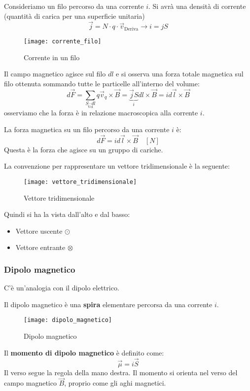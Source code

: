 \documentclass[a4paper]{article}
\begin{document}
\begin{example}
  Consideriamo un filo percorso da una corrente \( i \). Si avrà una densità di
  corrente (quantità di carica per una superficie unitaria)
  \[
    \vec{j} = N \cdot q \cdot \vec{v}_{\text{Deriva}} \to i = jS
  \] 
  \begin{figure}[H]
    \centering
    \texttt{[image: corrente\_filo]}
    \caption{Corrente in un filo}
  \end{figure}
  \noindent
  Il campo magnetico agisce sul filo \( dl \) e si osserva una forza totale magnetica sul filo
  ottenuta sommando tutte le particelle all'interno del volume:
  \[
    d\vec{F} = \sum_{\underset{\text{Vol}}{S \cdot dl}} q \vec{v}_q \times \vec{B}
    = \underbrace{\vec{j} S}_{i} dl \times \vec{B} = i d\vec{l} \times \vec{B}
  \] 
  osserviamo che la forza è in relazione macroscopica alla corrente \( i \).
\end{example}

\begin{definition}
  La forza magnetica su un filo percorso da una corrente \( i \) è:
  \[
    d\vec{F} = i d\vec{l} \times \vec{B} \quad \left[ N \right]
  \] 
  Questa è la forza che agisce su un gruppo di cariche.
\end{definition}

\begin{define}
  La convenzione per rappresentare un vettore tridimensionale è la seguente:
  \begin{figure}[H]
    \centering
    \texttt{[image: vettore\_tridimensionale]}
    \caption{Vettore tridimensionale}
  \end{figure}
  \noindent
  Quindi si ha la vista dall'alto e dal basso:
  \begin{itemize}
    \item Vettore uscente \( \odot \)
    \item Vettore entrante \( \otimes \)
  \end{itemize}
\end{define}

\subsubsection{Dipolo magnetico}
C'è un'analogia con il dipolo elettrico.
\begin{definition}
  Il dipolo magnetico è una \textbf{spira} elementare percorsa da una corrente \( i \).
  \begin{figure}[H]
    \centering
    \texttt{[image: dipolo\_magnetico]}
    \caption{Dipolo magnetico}
  \end{figure}
  \noindent
  Il \textbf{momento di dipolo magnetico} è definito come:
  \[
    \vec{\mu} = i \vec{S}
  \]
  Il verso segue la regola della mano destra. Il momento si orienta nel verso del
  campo magnetico \( \vec{B} \), proprio come gli aghi magnetici.
\end{definition}
\end{document}
